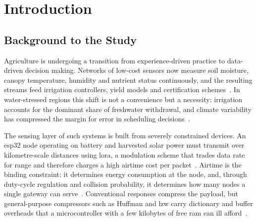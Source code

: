 \documentclass[12pt,a4paper,oneside]{book}
\begin{document}
\begin{singlespace}
\renewcommand{\listtablename}{}
\vspace{-3\baselineskip}
\listoftables
\end{singlespace}
\clearpage

\begin{singlespace}
\printunsrtglossary[type=abbreviations,title={},style=long]
\end{singlespace}
\clearpage

\mainmatter

\clearpage{}

\chapter{Introduction}
\label{ch:introduction}

\section{Background to the Study}
\label{sec:background}

Agriculture is undergoing a transition from experience-driven practice to
data-driven decision making. Networks of low-cost sensors now measure soil
moisture, canopy temperature, humidity and nutrient status continuously, and
the resulting streams feed irrigation controllers, yield models and
certification schemes~\cite{rathi2025smart, brooks2019precisionWater}. In
water-stressed regions this shift is not a convenience but a necessity:
irrigation accounts for the dominant share of freshwater withdrawal, and
climate variability has compressed the margin for error in scheduling
decisions~\cite{miller2020climateImpact, williams2022savings}.

The sensing layer of such systems is built from severely constrained devices.
An \gls{esp32} node operating on battery and harvested solar power must
transmit over kilometre-scale distances using \gls{lora}, a modulation scheme
that trades data rate for range and therefore charges a high airtime cost per
packet~\cite{raza2018lorawan, adelantado2017understanding}. Airtime is the
binding constraint: it determines energy consumption at the node, and, through
duty-cycle regulation and collision probability, it determines how many nodes a
single gateway can serve~\cite{mohammed2025loraEnergy}. Conventional responses
compress the payload, but general-purpose compressors such as Huffman and
\gls{lzw} carry dictionary and buffer overheads that a microcontroller with a
few kilobytes of free \gls{ram} can ill afford~\cite{marcelloni2009energy,
chen2025compression}.
\end{document}

